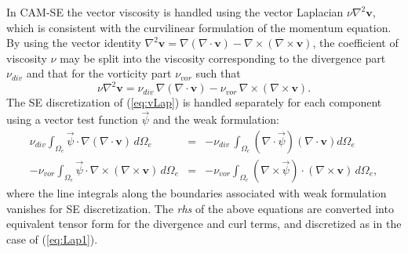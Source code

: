 \documentclass{agujournal}
\begin{document}
 In CAM-SE the vector viscosity is handled  using the vector Laplacian $\nu \nabla^2 \mathbf{v}$, 
 which is consistent with the curvilinear formulation of the momentum equation.  By using the vector identity 
 $\nabla^2 \mathbf{v} = \nabla(\nabla \cdot \mathbf{v}) - \nabla \times (\nabla \times \mathbf{v}) $, 
 the coefficient of viscosity $\nu$ may be split into the viscosity corresponding to the divergence part $\nu_{div}$
 and that for  the vorticity part $\nu_{vor}$ such that 
 \begin{equation}
  \nu \nabla^2 \mathbf{v} = \nu_{div} \, \nabla(\nabla \cdot \mathbf{v}) -
   \nu_{vor} \,  \nabla \times (\nabla \times \mathbf{v}). \label{eq:vLap}
 \end{equation}
   The SE discretization  of (\ref{eq:vLap}) is handled separately for each component using a vector test function
   $\vec{ \psi}$ and the weak formulation: 
   \begin{eqnarray}
       \nu_{div}  \int_{\Omega_e} \vec{\psi} \cdot   \nabla(\nabla \cdot \mathbf{v})  \,    d \Omega_e  & = & 
       -  \nu_{div} \, \int_{\Omega_e} (\nabla \cdot \vec{\psi})   (\nabla \cdot \mathbf{v})   d \Omega_e \\
         -   \nu_{vor}  \int_{\Omega_e}     \vec{\psi} \cdot  \nabla \times (\nabla \times \mathbf{v})   \,    d \Omega_e  & = &
                          -   \nu_{vor}  \int_{\Omega_e} (\nabla \times      \vec{\psi} ) \cdot (\nabla \times \mathbf{v})    \,     d \Omega_e ,  
   \end{eqnarray}
   where the line integrals along the boundaries associated with weak formulation  vanishes for SE discretization. 
   The {\em rhs} of the above equations are converted into equivalent tensor form  for the divergence and curl terms,
   and discretized as in the case of (\ref{eq:Lap1}). 
   
\end{document}
